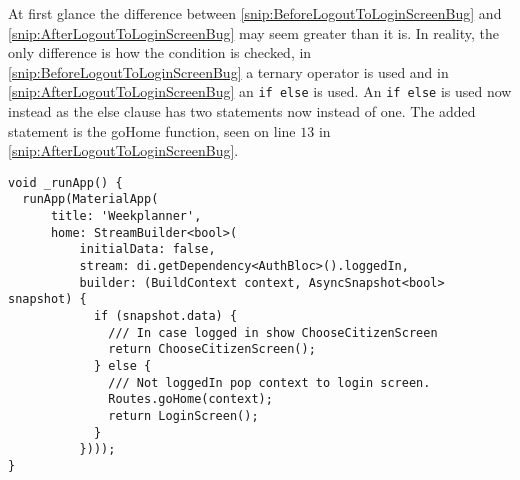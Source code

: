 At first glance the difference between \autoref{snip:BeforeLogoutToLoginScreenBug} and \autoref{snip:AfterLogoutToLoginScreenBug} may seem greater than it is.
In reality, the only difference is how the condition is checked, in \autoref{snip:BeforeLogoutToLoginScreenBug} a ternary operator is used and in \autoref{snip:AfterLogoutToLoginScreenBug} an \lstinline$if else$ is used.
An \lstinline$if else$ is used now instead as the else clause has two statements now instead of one.
The added statement is the goHome function, seen on line $13$ in \autoref{snip:AfterLogoutToLoginScreenBug}.

\begin{lstlisting}[label={snip:AfterLogoutToLoginScreenBug}, caption={The \_runApp function after the bug fix(notice the call to the goHome function)}, captionpos=b, language=CSharp] 
void _runApp() {
  runApp(MaterialApp(
      title: 'Weekplanner',
      home: StreamBuilder<bool>(
          initialData: false,
          stream: di.getDependency<AuthBloc>().loggedIn,
          builder: (BuildContext context, AsyncSnapshot<bool> snapshot) {
            if (snapshot.data) {
              /// In case logged in show ChooseCitizenScreen
              return ChooseCitizenScreen();
            } else {
              /// Not loggedIn pop context to login screen.
              Routes.goHome(context);
              return LoginScreen();
            }
          })));
}
\end{lstlisting}

